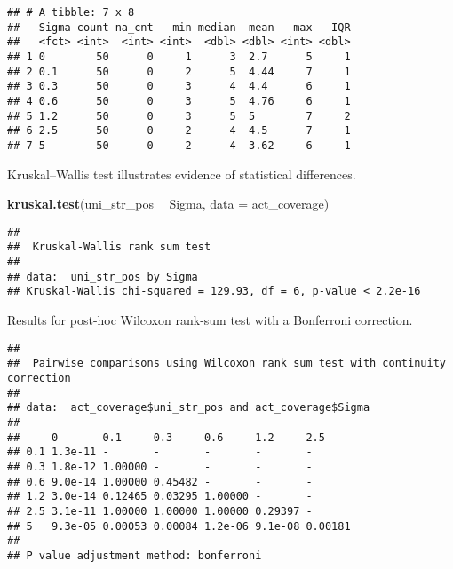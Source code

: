 \documentclass[]{book}
\newenvironment{Shaded}{\begin{snugshade}}{\end{snugshade}}
\newcommand{\DataTypeTok}[1]{\textcolor[rgb]{0.13,0.29,0.53}{#1}}
\newcommand{\KeywordTok}[1]{\textcolor[rgb]{0.13,0.29,0.53}{\textbf{#1}}}
\newcommand{\NormalTok}[1]{#1}
\newcommand{\OperatorTok}[1]{\textcolor[rgb]{0.81,0.36,0.00}{\textbf{#1}}}
\newcommand{\OtherTok}[1]{\textcolor[rgb]{0.56,0.35,0.01}{#1}}
\newcommand{\StringTok}[1]{\textcolor[rgb]{0.31,0.60,0.02}{#1}}
\begin{document}
\begin{verbatim}
## # A tibble: 7 x 8
##   Sigma count na_cnt   min median  mean   max   IQR
##   <fct> <int>  <int> <int>  <dbl> <dbl> <int> <dbl>
## 1 0        50      0     1      3  2.7      5     1
## 2 0.1      50      0     2      5  4.44     7     1
## 3 0.3      50      0     3      4  4.4      6     1
## 4 0.6      50      0     3      5  4.76     6     1
## 5 1.2      50      0     3      5  5        7     2
## 6 2.5      50      0     2      4  4.5      7     1
## 7 5        50      0     2      4  3.62     6     1
\end{verbatim}

Kruskal--Wallis test illustrates evidence of statistical differences.

\begin{Shaded}
\begin{Highlighting}[]
\KeywordTok{kruskal.test}\NormalTok{(uni_str_pos }\OperatorTok{~}\StringTok{ }\NormalTok{Sigma, }\DataTypeTok{data =}\NormalTok{ act_coverage)}
\end{Highlighting}
\end{Shaded}

\begin{verbatim}
## 
##  Kruskal-Wallis rank sum test
## 
## data:  uni_str_pos by Sigma
## Kruskal-Wallis chi-squared = 129.93, df = 6, p-value < 2.2e-16
\end{verbatim}

Results for post-hoc Wilcoxon rank-sum test with a Bonferroni correction.

\begin{Shaded}
\end{Shaded}

\begin{verbatim}
## 
##  Pairwise comparisons using Wilcoxon rank sum test with continuity correction 
## 
## data:  act_coverage$uni_str_pos and act_coverage$Sigma 
## 
##     0       0.1     0.3     0.6     1.2     2.5    
## 0.1 1.3e-11 -       -       -       -       -      
## 0.3 1.8e-12 1.00000 -       -       -       -      
## 0.6 9.0e-14 1.00000 0.45482 -       -       -      
## 1.2 3.0e-14 0.12465 0.03295 1.00000 -       -      
## 2.5 3.1e-11 1.00000 1.00000 1.00000 0.29397 -      
## 5   9.3e-05 0.00053 0.00084 1.2e-06 9.1e-08 0.00181
## 
## P value adjustment method: bonferroni
\end{verbatim}
\end{document}
